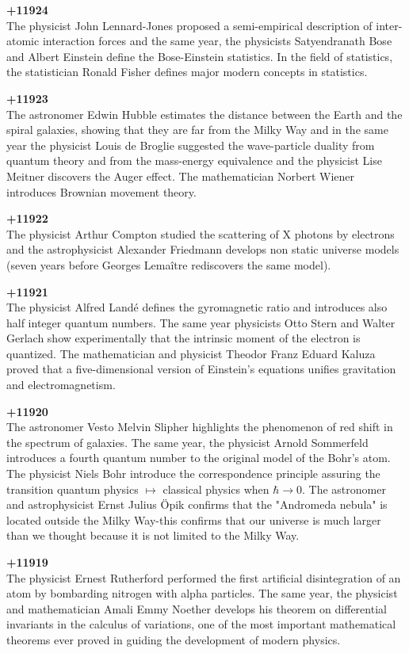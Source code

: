 \textbf{+11924}\\
The physicist John Lennard-Jones proposed a semi-empirical description of inter-atomic interaction forces and the same year, the physicists Satyendranath Bose and Albert Einstein define the Bose-Einstein statistics. In the field of statistics, the statistician Ronald Fisher defines major modern concepts in statistics.

\textbf{+11923}\\
The astronomer Edwin Hubble estimates the distance between the Earth and the spiral galaxies, showing that they are far from the Milky Way and in the same year the physicist Louis de Broglie suggested the wave-particle duality from quantum theory and from the mass-energy equivalence and the physicist Lise Meitner discovers the Auger effect. The mathematician Norbert Wiener introduces Brownian movement theory.

\textbf{+11922}\\
The physicist Arthur Compton studied the scattering of X photons by electrons and the astrophysicist Alexander Friedmann develops non static universe models (seven years before Georges Lemaître rediscovers the same model).

\textbf{+11921}\\
The physicist Alfred Landé defines the gyromagnetic ratio and introduces also half integer quantum numbers. The same year physicists Otto Stern and Walter Gerlach show experimentally that the intrinsic moment of the electron is quantized. The mathematician and physicist Theodor Franz Eduard Kaluza proved that a five-dimensional version of Einstein's equations unifies gravitation and electromagnetism.

\textbf{+11920}\\
The astronomer Vesto Melvin Slipher highlights the phenomenon of red shift in the spectrum of galaxies. The same year, the physicist Arnold Sommerfeld introduces a fourth quantum number to the original model of the Bohr's atom. The physicist Niels Bohr introduce the correspondence principle assuring the transition quantum physics $\mapsto$ classical physics when $\hbar\rightarrow 0$. The astronomer and astrophysicist Ernst Julius Öpik confirms that the "Andromeda nebula" is located outside the Milky Way-this confirms that our universe is much larger than we thought because it is not limited to the Milky Way.

\textbf{+11919}\\
The physicist Ernest Rutherford performed the first artificial disintegration of an atom by bombarding nitrogen with alpha particles. The same year, the physicist and mathematician Amali Emmy Noether develops his theorem on differential invariants in the calculus of variations, one of the most important mathematical theorems ever proved in guiding the development of modern physics.

